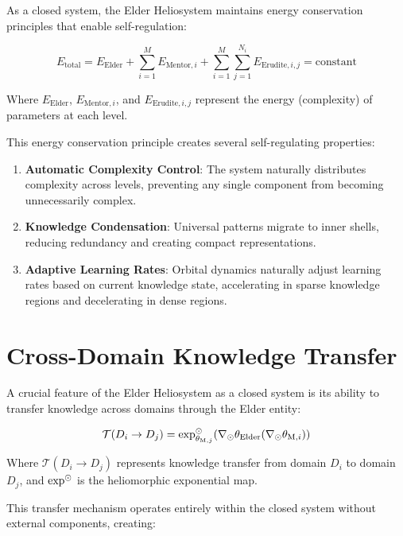 As a closed system, the Elder Heliosystem maintains energy conservation principles that enable self-regulation:

\begin{equation}
E_{\text{total}} = E_{\text{Elder}} + \sum_{i=1}^M E_{\text{Mentor},i} + \sum_{i=1}^M \sum_{j=1}^{N_i} E_{\text{Erudite},i,j} = \text{constant}
\end{equation}

Where $E_{\text{Elder}}$, $E_{\text{Mentor},i}$, and $E_{\text{Erudite},i,j}$ represent the energy (complexity) of parameters at each level.

This energy conservation principle creates several self-regulating properties:

\begin{enumerate}
    \item \textbf{Automatic Complexity Control}: The system naturally distributes complexity across levels, preventing any single component from becoming unnecessarily complex.
    
    \item \textbf{Knowledge Condensation}: Universal patterns migrate to inner shells, reducing redundancy and creating compact representations.
    
    \item \textbf{Adaptive Learning Rates}: Orbital dynamics naturally adjust learning rates based on current knowledge state, accelerating in sparse knowledge regions and decelerating in dense regions.
\end{enumerate}

\section{Cross-Domain Knowledge Transfer}

A crucial feature of the Elder Heliosystem as a closed system is its ability to transfer knowledge across domains through the Elder entity:

\begin{equation}
\mathcal{T}(D_i \rightarrow D_j) = \exp^{\odot}_{\theta_{\text{M},j}}(\nabla_{\odot} \theta_{\text{Elder}}(\nabla_{\odot} \theta_{\text{M},i}))
\end{equation}

Where $\mathcal{T}(D_i \rightarrow D_j)$ represents knowledge transfer from domain $D_i$ to domain $D_j$, and $\exp^{\odot}$ is the heliomorphic exponential map.

This transfer mechanism operates entirely within the closed system without external components, creating:

